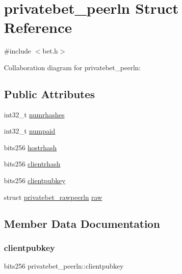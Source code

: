 \hypertarget{structprivatebet__peerln}{}\section{privatebet\+\_\+peerln Struct Reference}
\label{structprivatebet__peerln}


{\ttfamily \#include $<$bet.\+h$>$}



Collaboration diagram for privatebet\+\_\+peerln\+:
\subsection*{Public Attributes}
\begin{DoxyCompactItemize}
\item 
int32\+\_\+t \hyperlink{structprivatebet__peerln_accd8b1a6dd4f84596603abfe1401c886}{numrhashes}
\item 
int32\+\_\+t \hyperlink{structprivatebet__peerln_abcb19c688a0e4f8c4e4854079526899f}{numpaid}
\item 
bits256 \hyperlink{structprivatebet__peerln_a1bdfd627f7ae81d4b09a245173e42773}{hostrhash}
\item 
bits256 \hyperlink{structprivatebet__peerln_a0260b68acba6b1658e2e2b73b2586cdc}{clientrhash}
\item 
bits256 \hyperlink{structprivatebet__peerln_a6324e33f89ff4379976cfa983bc58065}{clientpubkey}
\item 
struct \hyperlink{structprivatebet__rawpeerln}{privatebet\+\_\+rawpeerln} \hyperlink{structprivatebet__peerln_ab2eaa65aa69210d0dc5431f5d3a27b56}{raw}
\end{DoxyCompactItemize}


\subsection{Member Data Documentation}
\mbox{\label{structprivatebet__peerln_a6324e33f89ff4379976cfa983bc58065}} 
\subsubsection{\texorpdfstring{clientpubkey}{clientpubkey}}
{\footnotesize\ttfamily bits256 privatebet\+\_\+peerln\+::clientpubkey}

